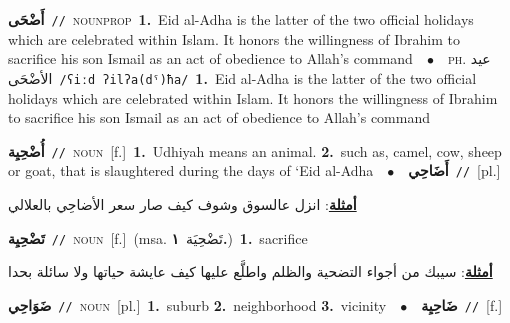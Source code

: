 \documentclass[10pt,a4paper,twoside]{article} %
\begin{document}
\begin{multicols}{2}
{{{{{{{\setlength\topsep{0pt}\textbf{\foreignlanguage{arabic}{أَضْحَى}}\ {\color{gray}\texttt{//}\color{black}}\ \textsc{noun\textunderscore prop}\ \textbf{1.}~Eid al-Adha is the latter of the two official holidays which are celebrated within Islam. It honors the willingness of Ibrahim to sacrifice his son Ismail as an act of obedience to Allah's command\ \ $\bullet$\ \ \textsc{ph.} \color{gray} \foreignlanguage{arabic}{عيد الأضْحَى}\color{black}\ {\color{gray}\texttt{/{\sffamily ʕiːd ʔilʔa(dˤ)ħa}/}\color{black}}\ \textbf{1.}~Eid al-Adha is the latter of the two official holidays which are celebrated within Islam. It honors the willingness of Ibrahim to sacrifice his son Ismail as an act of obedience to Allah's command\ 

{\setlength\topsep{0pt}\textbf{\foreignlanguage{arabic}{أُضْحِيِة}}\ {\color{gray}\texttt{//}\color{black}}\ \textsc{noun}\ [f.]\ \textbf{1.}~Udhiyah means an animal.  \textbf{2.}~such as, camel, cow, sheep or goat, that is slaughtered during the days of ‘Eid al-Adha\ \ $\bullet$\ \ \setlength\topsep{0pt}\textbf{\foreignlanguage{arabic}{أَضَاحِي}}\ {\color{gray}\texttt{//}\color{black}}\ [pl.]\  \begin{flushright}\color{gray}\foreignlanguage{arabic}{\textbf{\underline{\foreignlanguage{arabic}{أمثلة}}}: انزل عالسوق وشوف كيف صار سعر الأضاحِي بالعلالي}\end{flushright}\color{black}} \vspace{2mm}

{\setlength\topsep{0pt}\textbf{\foreignlanguage{arabic}{تَضْحِيِة}}\ {\color{gray}\texttt{//}\color{black}}\ \textsc{noun}\ [f.]\ \color{gray}(msa. \foreignlanguage{arabic}{تَضْحِيَة}~\foreignlanguage{arabic}{\textbf{١.}})\color{black}\ \textbf{1.}~sacrifice\  \begin{flushright}\color{gray}\foreignlanguage{arabic}{\textbf{\underline{\foreignlanguage{arabic}{أمثلة}}}: سيبك من أجواء التضحية والظلم واطلَّع عليها كيف عايشة حياتها ولا سائلة بحدا}\end{flushright}\color{black}} \vspace{2mm}

{\setlength\topsep{0pt}\textbf{\foreignlanguage{arabic}{ضَوَاحِي}}\ {\color{gray}\texttt{//}\color{black}}\ \textsc{noun}\ [pl.]\ \textbf{1.}~suburb  \textbf{2.}~neighborhood  \textbf{3.}~vicinity\ \ $\bullet$\ \ \setlength\topsep{0pt}\textbf{\foreignlanguage{arabic}{ضَاحِيِة}}\ {\color{gray}\texttt{//}\color{black}}\ [f.]\ 

}}}}}}}}
\end{multicols}
\end{document}
